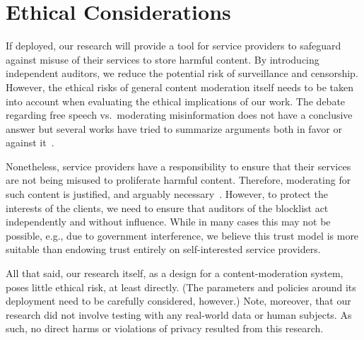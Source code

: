 \documentclass[sigconf,anonymous,review]{acmart}
\begin{document}

\maketitle





 
% 
%
%
%
%



\newpage
\section{Ethical Considerations}
%
If deployed, our research will provide a tool for service providers to
safeguard against misuse of their services to store harmful
content. By introducing independent auditors, we reduce the potential
risk of surveillance and censorship. However, the ethical risks of
general content moderation itself needs to be taken into account when
evaluating the ethical implications of our work. The debate regarding
free speech vs.\ moderating misinformation does not have a conclusive
answer but several works have tried to summarize arguments both in
favor or against it~\cite{kozyreva2023resolving}.

Nonetheless, service providers have a responsibility to ensure that
their services are not being misused to proliferate harmful
content. Therefore, moderating for such content is justified, and
arguably necessary~\cite{howard2023ethics}. However, to protect the
interests of the clients, we need to ensure that auditors of the
blocklist act independently and without influence. While in many cases
this may not be possible, e.g., due to government interference, we
believe this trust model is more suitable than endowing trust entirely
on self-interested service providers.

All that said, our research itself, as a design for a
content-moderation system, poses little ethical risk, at least
directly.  (The parameters and policies around its deployment need to
be carefully considered, however.)  Note, moreover, that our research
did not involve testing with any real-world data or human subjects. As
such, no direct harms or violations of privacy resulted from this
research.
\end{document}
